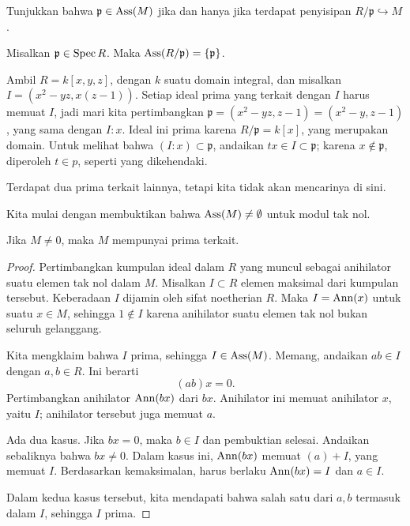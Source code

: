 \begin{exercise} 
Tunjukkan bahwa $\mathfrak{p} \in \operatorname{Ass}(M)$ jika dan hanya jika terdapat penyisipan
$R/\mathfrak{p} \hookrightarrow M$.
\end{exercise} 

\begin{exercise} 
Misalkan $\mathfrak{p} \in \operatorname{Spec} R$. Maka $\operatorname{Ass}(R/\mathfrak{p}) =
\left\{\mathfrak{p}\right\}$.
\end{exercise} 

\begin{example}
Ambil $R=k[x,y,z]$, dengan $k$ suatu domain integral, dan misalkan $I = (x^2-yz,x(z-1))$. Setiap
 ideal prima yang terkait dengan $I$ harus memuat $I$, jadi mari kita pertimbangkan
   $\mathfrak{p}=(x^2-yz,z-1)=(x^2-y,z-1)$, yang sama dengan $I:x$. Ideal ini prima karena $R/\mathfrak{p} = k[x]$,
   yang merupakan domain. Untuk melihat bahwa $(I:x)\subset \mathfrak{p}$, andaikan $tx\in I\subset \mathfrak{p}$; karena
   $x\not\in \mathfrak{p}$, diperoleh $t\in p$, seperti yang dikehendaki.

   Terdapat dua prima terkait lainnya, tetapi kita tidak akan mencarinya di sini.
 \end{example}


Kita mulai dengan membuktikan bahwa $\operatorname{Ass}(M) \neq \emptyset$ untuk modul tak nol. 
\begin{proposition} \label{assmnonempty} 
Jika $M \neq 0$, maka $M$ mempunyai prima terkait.
\end{proposition} 
\begin{proof}  Pertimbangkan kumpulan ideal dalam $R$ yang muncul sebagai
anihilator suatu elemen tak nol dalam $M$. 
Misalkan $I \subset R$ elemen maksimal dari kumpulan tersebut. Keberadaan $I$ dijamin oleh sifat noetherian
$R$.
Maka $I = \operatorname{Ann}(x)$ untuk suatu $x \in M$, sehingga $1 \notin I$ karena anihilator suatu elemen tak nol bukan seluruh
gelanggang.

Kita mengklaim bahwa
$I$ prima, sehingga $I \in \operatorname{Ass}(M)$.  
Memang, andaikan $ab \in I$ dengan $a,b \in R$. Ini berarti
\[ (ab)x = 0.  \]
Pertimbangkan anihilator $\operatorname{Ann}(bx)$ dari $bx$. Anihilator ini memuat anihilator $x$, yaitu $I$;
anihilator tersebut juga memuat $a$.

Ada dua kasus. Jika $bx = 0$, maka $ b \in I$ dan pembuktian selesai. Andaikan
sebaliknya bahwa $bx \neq 0$. Dalam kasus ini, $\operatorname{Ann}(bx)$ memuat $(a) + I$, yang
 memuat $I$. Berdasarkan kemaksimalan, harus berlaku $\operatorname{Ann}(bx) = I$ dan $ a \in
 I$. 

 Dalam kedua kasus tersebut, kita mendapati bahwa salah satu dari $a,b $ termasuk dalam $I$, sehingga $I$
 prima. 

\end{proof} 

